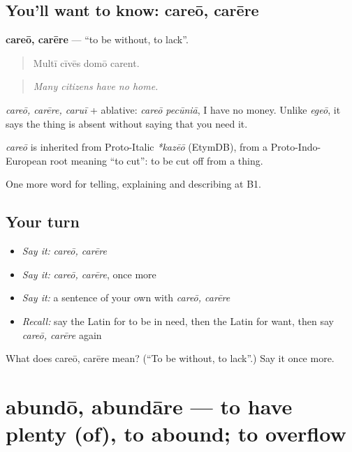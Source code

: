 \subsection*{You'll want to know: careō, carēre}
\textbf{careō, carēre} — \textquotedblleft{}to be without, to lack\textquotedblright{}.

\begin{quote}
Multī cīvēs domō carent.
\end{quote}

\begin{quote}
\emph{Many citizens have no home.}
\end{quote}

\emph{careō, carēre, caruī} + ablative: \emph{careō pecūniā}, I have no money. Unlike \emph{egeō}, it says the thing is absent without saying that you need it.

\begin{cousinweb}
\emph{careō} is inherited from Proto-Italic \emph{*kazēō} (EtymDB), from a Proto-Indo-European root meaning \textquotedblleft{}to cut\textquotedblright{}: to be cut off from a thing.
\end{cousinweb}

\begin{grammarlens}[title={What you've built}]
One more word for telling, explaining and describing at B1.
\end{grammarlens}

\subsection*{Your turn}
\begin{itemize}
\raggedright
  \item \emph{Say it:} \emph{careō, carēre}
  \item \emph{Say it:} \emph{careō, carēre}, once more
  \item \emph{Say it:} a sentence of your own with \emph{careō, carēre}
  \item \emph{Recall:} say the Latin for to be in need, then the Latin for want, then say \emph{careō, carēre} again
\end{itemize}

\begin{tcolorbox}[breakable,colback=teal!4,colframe=teal!35!black,title={Before you move on}]
What does careō, carēre mean? (\textquotedblleft{}To be without, to lack\textquotedblright{}.) Say it once more.
\end{tcolorbox}
\section[abundō, abundāre]{abundō, abundāre — to have plenty (of), to abound; to overflow}


